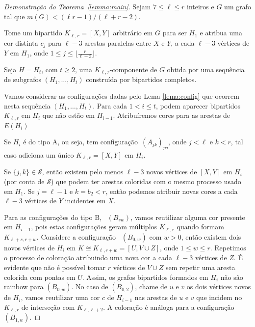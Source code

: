 \documentclass[11pt,twoside,a4paper]{book}
\newcommand{\K}{K_{\ell,r}} %
\theoremstyle{note}
\begin{document}
    \begin{proof}[Demonstração do Teorema~\ref{lemma:main}]
      Sejam $7 \leq \ell \leq r$ inteiros e $G$ um grafo tal que $m(G) < (\ell r - 1)/(\ell+r-2)$.
    
        Tome um bipartido $\K = [X,Y]$ arbitrário em $G$ para ser $H_1$ e atribua uma cor distinta $c_j$ para $\ell-3$ arestas paralelas entre $X$ e $Y$, a cada $\ell-3$ vértices de $Y$ em $H_1$, onde
        $1 \leq j \leq \lfloor \frac{r}{\ell-3}\rfloor$.

        Seja $H = H_t$, com $t \geq 2$, uma $\K$-componente de $G$ obtida por uma sequência de subgrafos $(H_1, \ldots, H_t)$ construída por bipartidos completos.

         Vamos considerar as configurações dadas pelo Lema \ref{lema:config} que ocorrem nesta sequência $(H_1, \ldots, H_t)$.
         Para cada $1 < i \leq t$, podem aparecer bipartidos $\K$ em $H_{i}$ que não estão em $H_{i-1}$.
         Atribuíremos cores para as arestas de $E(H_{i})$ %

        Se $H_i$ é do tipo A, ou seja, tem configuração~\hyperref[configA]{$(A_{jk})_{pq}$}, onde $j < \ell$ e $k < r$, %
        tal caso adiciona um único $\K = [X,Y]$ em $H_i$.
        
      Se $\{j,k\} \in \mathcal{S}$, então existem pelo menos $\ell-3$ novos vértices de $[X,Y]$ em $H_i$ (por conta de $\mathcal{S}$) que podem ter arestas coloridas com o mesmo processo usado em $H_1$.        
      Se $j = \ell-1$ e $k=b_2 < r$, então podemos atribuir novas cores a cada $\ell-3$ vértices de $Y$ incidentes em $X$.

      Para as configurações do tipo B, ~\hyperref[configB]{$(B_{sw})$}, vamos reutilizar alguma cor presente em $H_{i-1}$, pois estas configurações geram múltiplos $\K$ quando formam $K_{\ell+s,r+w}$.        
      Considere a configuração ~\hyperref[configB]{$(B_{0,w})$} com $w > 0$, então existem dois novos vértices de
      $H_i$ em $K \cong K_{\ell,r+w} =[U, V \cup Z]$, 
      onde $1 \leq w \leq r$.  
      Repetimos o processo de coloração atribuindo uma nova cor a cada $\ell-3$ 
     vértices de $Z$.
      É evidente que não é possível tomar $r$ vértices de $V \cup Z$ sem repetir uma aresta colorida com pontas em $U$.
      Assim, os grafos bipartidos formados em $H_i$ não são rainbow para $(B_{0,w})$.  
	  No caso de $(B_{0,2})$, chame de $u$ e $v$ os dois vértices novos de $H_i$, vamos reutilizar uma cor $c$ de $H_{i-1}$ nas arestas de $u$ e $v$ que incidem no $\K$ de interseção com $K_{\ell,\ell+2}$.  
        A coloração é análoga para a configuração $(B_{1,w})$.


\end{proof}
\end{document}
